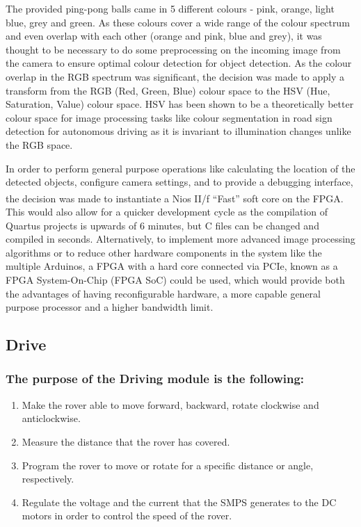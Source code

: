 \documentclass[a4paper]{article}
\begin{document}
The provided ping-pong balls came in 5 different colours - pink, orange, light 
blue, grey and green. As these colours cover a wide range of the colour spectrum
and even overlap with each other (orange and pink, blue and grey), it was thought 
to be necessary to do some preprocessing on the incoming image from the camera 
to ensure optimal colour detection for object detection.  
As the colour overlap in the RGB spectrum was significant, the decision was made to apply
a transform from the RGB (Red, Green, Blue) colour space to the HSV (Hue, 
Saturation, Value) colour space.  HSV has been shown to be a theoretically better colour space
for image processing tasks like colour segmentation in road sign detection for 
autonomous driving as it is invariant to illumination changes unlike the RGB 
space.\cite{ali2013performance} 

In order to perform general purpose operations like
    calculating the location of the detected objects,
    configure camera settings,
    and to provide a debugging interface,
the decision was made to instantiate a Nios\textsuperscript{\textregistered} II/f ``Fast'' soft core on the FPGA. 
This would also allow for a quicker development cycle as the compilation of Quartus projects
is upwards of 6 minutes, but C files can be changed and compiled in seconds. 
Alternatively, to implement more advanced image processing algorithms
or to reduce other hardware components in the system like the multiple Arduinos, 
a FPGA with a hard core connected via PCIe, 
known as a FPGA System-On-Chip (FPGA SoC) \cite{FPGASoC} could be used, 
which would provide both the advantages of having reconfigurable hardware,
a more capable general purpose processor and a higher bandwidth limit.




\subsection{Drive}
\subsubsection{The purpose of the Driving module is the following:}
\begin{enumerate}
  \item Make the rover able to move forward, backward, rotate clockwise and anticlockwise.
  \item Measure the distance that the rover has covered. 
  \item Program the rover to move or rotate for a specific distance or angle, respectively.
  \item Regulate the voltage and the current that the SMPS generates to the DC motors in order to control the speed of the rover.
\end{enumerate}
\end{document}
